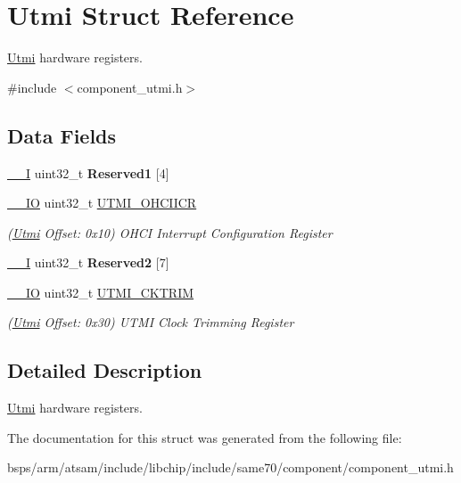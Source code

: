 \hypertarget{structUtmi}{}\section{Utmi Struct Reference}
\label{structUtmi}


\mbox{\hyperlink{structUtmi}{Utmi}} hardware registers.  




{\ttfamily \#include $<$component\+\_\+utmi.\+h$>$}

\subsection*{Data Fields}
\begin{DoxyCompactItemize}
\item 
\mbox{\label{structUtmi_ab62ea521fbd01d5046f5e6b7118950fc}} 
\mbox{\hyperlink{core__cm7_8h_af63697ed9952cc71e1225efe205f6cd3}{\+\_\+\+\_\+I}} uint32\+\_\+t {\bfseries Reserved1} \mbox{[}4\mbox{]}
\item 
\mbox{\label{structUtmi_a07bbcd653dee376f18278d77bdd5ee9a}} 
\mbox{\hyperlink{core__cm7_8h_aec43007d9998a0a0e01faede4133d6be}{\+\_\+\+\_\+\+IO}} uint32\+\_\+t \mbox{\hyperlink{structUtmi_a07bbcd653dee376f18278d77bdd5ee9a}{U\+T\+M\+I\+\_\+\+O\+H\+C\+I\+I\+CR}}
\begin{DoxyCompactList}\small\item\em (\mbox{\hyperlink{structUtmi}{Utmi}} Offset\+: 0x10) O\+H\+CI Interrupt Configuration Register \end{DoxyCompactList}\item 
\mbox{\label{structUtmi_a8604fa5450cd0ae46625fddbe80a6164}} 
\mbox{\hyperlink{core__cm7_8h_af63697ed9952cc71e1225efe205f6cd3}{\+\_\+\+\_\+I}} uint32\+\_\+t {\bfseries Reserved2} \mbox{[}7\mbox{]}
\item 
\mbox{\label{structUtmi_ab6459e9af985b92f334686fcf4b74a9d}} 
\mbox{\hyperlink{core__cm7_8h_aec43007d9998a0a0e01faede4133d6be}{\+\_\+\+\_\+\+IO}} uint32\+\_\+t \mbox{\hyperlink{structUtmi_ab6459e9af985b92f334686fcf4b74a9d}{U\+T\+M\+I\+\_\+\+C\+K\+T\+R\+IM}}
\begin{DoxyCompactList}\small\item\em (\mbox{\hyperlink{structUtmi}{Utmi}} Offset\+: 0x30) U\+T\+MI Clock Trimming Register \end{DoxyCompactList}\end{DoxyCompactItemize}


\subsection{Detailed Description}
\mbox{\hyperlink{structUtmi}{Utmi}} hardware registers. 

The documentation for this struct was generated from the following file\+:\begin{DoxyCompactItemize}
\item 
bsps/arm/atsam/include/libchip/include/same70/component/component\+\_\+utmi.\+h\end{DoxyCompactItemize}
